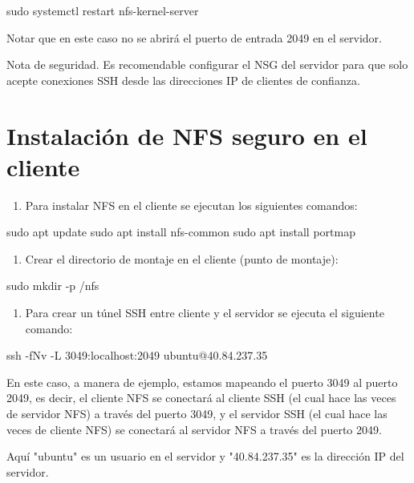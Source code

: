 \begin{SourceCode}
sudo systemctl restart nfs-kernel-server
\end{SourceCode}

Notar que en este caso no se abrirá el puerto de entrada 2049 en el servidor.

Nota de seguridad. Es recomendable configurar el NSG del servidor para que solo acepte conexiones SSH desde las direcciones IP de clientes de confianza.

\section{Instalación de NFS seguro en el cliente}

\begin{enumerate}
\item Para instalar NFS en el cliente se ejecutan los siguientes comandos:
\end{enumerate}

\begin{SourceCode}
sudo apt update
sudo apt install nfs-common
sudo apt install portmap
\end{SourceCode}

\begin{enumerate}
\item Crear el directorio de montaje en el cliente (punto de montaje):
\end{enumerate}

\begin{SourceCode}
sudo mkdir -p /nfs
\end{SourceCode}

\begin{enumerate}
\item Para crear un túnel SSH entre cliente y el servidor se ejecuta el siguiente comando:
\end{enumerate}

\begin{SourceCode}
ssh -fNv -L 3049:localhost:2049 ubuntu@40.84.237.35
\end{SourceCode}

En este caso, a manera de ejemplo, estamos mapeando el puerto 3049 al puerto 2049, es decir, el cliente NFS se conectará al cliente SSH (el cual hace las veces de servidor NFS) a través del puerto 3049, y el servidor SSH (el cual hace las veces de cliente NFS) se conectará al servidor NFS a través del puerto 2049.

\begin{SourceCode}
Aquí "ubuntu" es un usuario en el servidor y "40.84.237.35" es la dirección IP del servidor.
\end{SourceCode}

